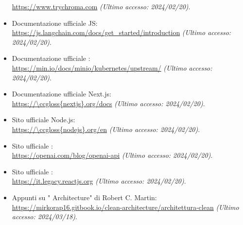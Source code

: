 \begin{itemize}
    \url{https://www.trychroma.com} \textit{(Ultimo accesso: 2024/02/20)}.
    \item Documentazione ufficiale  JS: \\
    \url{https://js.langchain.com/docs/get_started/introduction} \textit{(Ultimo accesso: 2024/02/20)}.
    \item Documentazione ufficiale : \\
    \url{https://min.io/docs/minio/kubernetes/upstream/} \textit{(Ultimo accesso: 2024/02/20)}.
    \item Documentazione ufficiale Next.js: \\
    \url{https://\ccgloss{nextjs}.org/docs} \textit{(Ultimo accesso: 2024/02/20)}.
    \item Sito ufficiale Node.js: \\
    \url{https://\ccgloss{nodejs}.org/en} \textit{(Ultimo accesso: 2024/02/20)}.
    \item Sito ufficiale  : \\
    \url{https://openai.com/blog/openai-api} \textit{(Ultimo accesso: 2024/02/20)}.
    \item Sito ufficiale : \\
    \url{https://it.legacy.reactjs.org} \textit{(Ultimo accesso: 2024/02/20)}.
    \item Appunti su " Architecture" di Robert C. Martin: \\
    \url{https://mirkorap16.gitbook.io/clean-architecture/architettura-clean} \textit{(Ultimo accesso: 2024/03/18)}.
\end{itemize}
